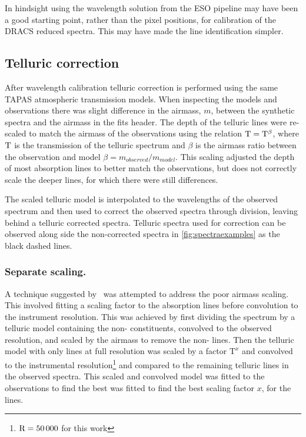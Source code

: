 In hindsight using the wavelength solution from the {ESO} pipeline may have been a good starting point, rather than the pixel positions, for calibration of the {DRACS} reduced spectra.
This may have made the line identification simpler.


\subsection{Telluric correction}
\label{subsec:telluric_correction_application}
After wavelength calibration telluric correction is performed using the same {TAPAS} atmospheric transmission models.
When inspecting the models and observations there was slight difference in the airmass, $m$, between the synthetic spectra and the airmass in the fits header.
The depth of the telluric lines were re-scaled to match the airmass of the observations using the relation \(\rm T = T^{\beta}\), where \(\rm T\) is the transmission of the telluric spectrum and \(\beta\) is the airmass ratio between the observation and model $\beta ={m_{observed}/m_{model}}$.
This scaling adjusted the depth of most absorption lines to better match the observations, but does not correctly scale the deeper  lines, for which there were still differences.

The scaled telluric model is interpolated to the wavelengths of the observed spectrum and then used to correct the observed spectra through division, leaving behind a telluric corrected spectra.
Telluric spectra used for correction can be observed along side the non-corrected spectra in \cref{fig:spectraexamples} as the black dashed lines.

\subsubsection{Separate  scaling.}
A technique suggested by~\citet{bertaux_tapas_2014} was attempted to address the poor  airmass scaling.
This involved fitting a scaling factor to the  absorption lines before convolution to the instrument resolution.
This was achieved by first dividing the spectrum by a telluric model containing the non- constituents, convolved to the observed resolution, and scaled by the airmass to remove the non- lines.
Then the telluric model with only  lines at full resolution was scaled by a factor \(\textrm{T}^{x}\) and convolved to the instrumental resolution\footnote{\(\rm R=50\,000\) for this work} and compared to the remaining telluric lines in the observed spectra.
This scaled and convolved model was fitted to the observations to find the best was fitted to find the best scaling factor \(x\), for the  lines.


